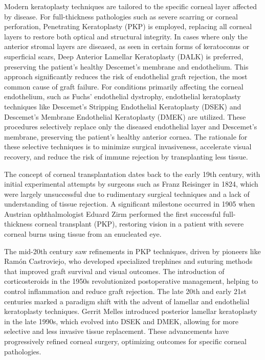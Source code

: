 Modern keratoplasty techniques are tailored to the specific corneal layer affected by disease. For full-thickness pathologies such as severe scarring or corneal perforation, Penetrating Keratoplasty (PKP) is employed, replacing all corneal layers to restore both optical and structural integrity. In cases where only the anterior stromal layers are diseased, as seen in certain forms of keratoconus or superficial scars, Deep Anterior Lamellar Keratoplasty (DALK) is preferred, preserving the patient's healthy Descemet's membrane and endothelium. This approach significantly reduces the risk of endothelial graft rejection, the most common cause of graft failure. For conditions primarily affecting the corneal endothelium, such as Fuchs' endothelial dystrophy, endothelial keratoplasty techniques like Descemet's Stripping Endothelial Keratoplasty (DSEK) and Descemet's Membrane Endothelial Keratoplasty (DMEK) are utilized. These procedures selectively replace only the diseased endothelial layer and Descemet's membrane, preserving the patient's healthy anterior cornea. The rationale for these selective techniques is to minimize surgical invasiveness, accelerate visual recovery, and reduce the risk of immune rejection by transplanting less tissue.

The concept of corneal transplantation dates back to the early 19th century, with initial experimental attempts by surgeons such as Franz Reisinger in 1824, which were largely unsuccessful due to rudimentary surgical techniques and a lack of understanding of tissue rejection. A significant milestone occurred in 1905 when Austrian ophthalmologist Eduard Zirm performed the first successful full-thickness corneal transplant (PKP), restoring vision in a patient with severe corneal burns using tissue from an enucleated eye.

The mid-20th century saw refinements in PKP techniques, driven by pioneers like Ramón Castroviejo, who developed specialized trephines and suturing methods that improved graft survival and visual outcomes. The introduction of corticosteroids in the 1950s revolutionized postoperative management, helping to control inflammation and reduce graft rejection. The late 20th and early 21st centuries marked a paradigm shift with the advent of lamellar and endothelial keratoplasty techniques. Gerrit Melles introduced posterior lamellar keratoplasty in the late 1990s, which evolved into DSEK and DMEK, allowing for more selective and less invasive tissue replacement. These advancements have progressively refined corneal surgery, optimizing outcomes for specific corneal pathologies.

